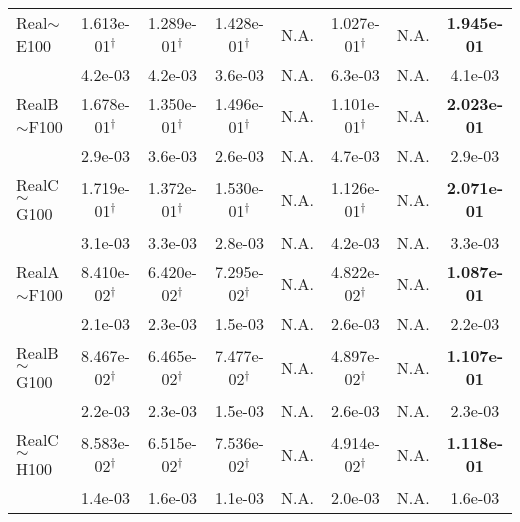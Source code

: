 {\begin{longtable}[c]{lccccccc}
    \midrule
    Real$\sim$E100         & 1.613e-01$^{\dag}$ & 1.289e-01$^{\dag}$ & 1.428e-01$^{\dag}$ & N.A.               & 1.027e-01$^{\dag}$ & N.A.               & \textbf{1.945e-01} \\
             & 4.2e-03            & 4.2e-03            & 3.6e-03            & N.A.               & 6.3e-03            & N.A.                        & 4.1e-03            \\
    \midrule
    RealB$\sim$F100       & 1.678e-01$^{\dag}$ & 1.350e-01$^{\dag}$ & 1.496e-01$^{\dag}$ & N.A.               & 1.101e-01$^{\dag}$ & N.A.                & \textbf{2.023e-01} \\
            & 2.9e-03            & 3.6e-03            & 2.6e-03            & N.A.               & 4.7e-03            & N.A.                         & 2.9e-03            \\
    \midrule
    RealC$\sim$G100      & 1.719e-01$^{\dag}$ & 1.372e-01$^{\dag}$ & 1.530e-01$^{\dag}$ & N.A.               & 1.126e-01$^{\dag}$ & N.A.                 & \textbf{2.071e-01} \\
             & 3.1e-03            & 3.3e-03            & 2.8e-03            & N.A.               & 4.2e-03            & N.A.                        & 3.3e-03            \\
    \midrule
    RealA$\sim$F100      & 8.410e-02$^{\dag}$ & 6.420e-02$^{\dag}$ & 7.295e-02$^{\dag}$ & N.A.               & 4.822e-02$^{\dag}$ & N.A.                  & \textbf{1.087e-01} \\
            & 2.1e-03            & 2.3e-03            & 1.5e-03            & N.A.               & 2.6e-03            & N.A.                         & 2.2e-03            \\
    \midrule
    RealB$\sim$G100      & 8.467e-02$^{\dag}$ & 6.465e-02$^{\dag}$ & 7.477e-02$^{\dag}$ & N.A.               & 4.897e-02$^{\dag}$ & N.A.             & \textbf{1.107e-01} \\
            & 2.2e-03            & 2.3e-03            & 1.5e-03            & N.A.               & 2.6e-03            & N.A.                          & 2.3e-03            \\
    \midrule
    RealC$\sim$H100      & 8.583e-02$^{\dag}$ & 6.515e-02$^{\dag}$ & 7.536e-02$^{\dag}$ & N.A.               & 4.914e-02$^{\dag}$ & N.A.                 & \textbf{1.118e-01} \\
          & 1.4e-03            & 1.6e-03            & 1.1e-03            & N.A.               & 2.0e-03            & N.A.                         & 1.6e-03            \\
    \midrule


\end{longtable}}
